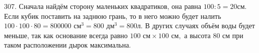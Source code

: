 307. Сначала найдём сторону маленьких квадратиков, она равна $100:5=20$см. Если кубик поставить на заднюю грань, то в него можно будет налить $100\cdot100\cdot80=800000\text{ см}^3=800\text{ дм}^3=800$л. В других случаях объём воды будет меньше, так как основание всегда равно $100\text{ см}\times100\text{ см},$ а высота 80 см при таком расположении дырок максимальна.\\
